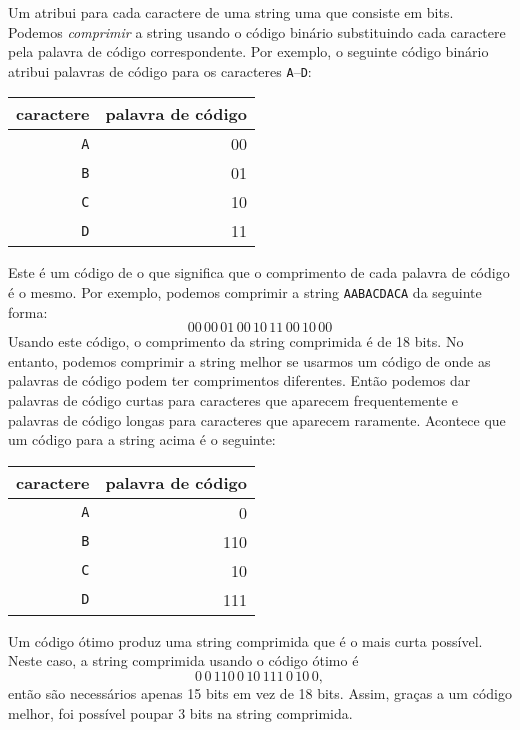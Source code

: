
Um  atribui para cada caractere
de uma string uma  que consiste em bits.
Podemos \emph{comprimir} a string usando o código binário
substituindo cada caractere pela
palavra de código correspondente.
Por exemplo, o seguinte código binário
atribui palavras de código para os caracteres
\texttt{A}–\texttt{D}:
\begin{center}
\begin{tabular}{rr}
caractere & palavra de código \\
\hline
\texttt{A} & 00 \\
\texttt{B} & 01 \\
\texttt{C} & 10 \\
\texttt{D} & 11 \\
\end{tabular}
\end{center}
Este é um código de 
o que significa que o comprimento de cada
palavra de código é o mesmo.
Por exemplo, podemos comprimir a string
\texttt{AABACDACA} da seguinte forma:
\[00\,00\,01\,00\,10\,11\,00\,10\,00\]
Usando este código, o comprimento da string comprimida
é de 18 bits.
No entanto, podemos comprimir a string melhor
se usarmos um código de 
onde as palavras de código podem ter comprimentos diferentes.
Então podemos dar palavras de código curtas para
caracteres que aparecem frequentemente
e palavras de código longas para caracteres
que aparecem raramente.
Acontece que um código 
para a string acima é o seguinte:
\begin{center}
\begin{tabular}{rr}
caractere & palavra de código \\
\hline
\texttt{A} & 0 \\
\texttt{B} & 110 \\
\texttt{C} & 10 \\
\texttt{D} & 111 \\
\end{tabular}
\end{center}
Um código ótimo produz uma string comprimida
que é o mais curta possível.
Neste caso, a string comprimida usando
o código ótimo é
\[0\,0\,110\,0\,10\,111\,0\,10\,0,\]
então são necessários apenas 15 bits em vez de 18 bits.
Assim, graças a um código melhor, foi possível
poupar 3 bits na string comprimida.


